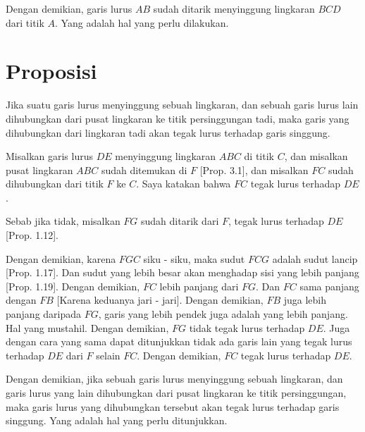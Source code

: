 \documentclass[a4paper]{book}
\begin{document}
Dengan demikian, garis lurus $AB$ sudah ditarik menyinggung lingkaran $BCD$ dari
titik $A$. Yang adalah hal yang perlu dilakukan.

\section*{\centering Proposisi \thesection}
Jika suatu garis lurus menyinggung sebuah lingkaran, dan sebuah garis lurus 
lain dihubungkan dari pusat lingkaran ke titik persinggungan tadi, maka garis
yang dihubungkan dari lingkaran tadi akan tegak lurus terhadap garis singgung.
\begin{center}
\end{center}
Misalkan garis lurus $DE$ menyinggung lingkaran $ABC$ di titik $C$, dan 
misalkan 
pusat lingkaran $ABC$ sudah ditemukan di $F$ [Prop. 3.1], dan misalkan $FC$ 
sudah
dihubungkan dari titik $F$ ke $C$. Saya katakan bahwa $FC$ tegak lurus terhadap
$DE$.

Sebab jika tidak, misalkan $FG$ sudah ditarik dari $F$, tegak lurus terhadap 
$DE$ [Prop. 1.12].

Dengan demikian, karena $FGC$ siku - siku, maka sudut $FCG$ adalah sudut lancip 
[Prop. 1.17]. Dan sudut yang lebih besar akan menghadap sisi yang lebih panjang 
[Prop. 1.19]. Dengan demikian, $FC$ lebih panjang dari $FG$. Dan $FC$ sama 
panjang dengan $FB$ [Karena keduanya jari - jari]. Dengan demikian, $FB$ juga 
lebih panjang daripada $FG$, garis yang lebih pendek juga adalah yang lebih
panjang. Hal yang mustahil. Dengan demikian, $FG$ tidak tegak lurus terhadap 
$DE$.  Juga dengan cara yang sama dapat ditunjukkan tidak ada garis lain yang 
tegak lurus terhadap $DE$ dari $F$ selain $FC$. Dengan demikian, $FC$ tegak 
lurus terhadap $DE$.

Dengan demikian, jika sebuah garis lurus menyinggung sebuah lingkaran, dan garis
lurus yang lain dihubungkan dari pusat lingkaran ke titik persinggungan, maka
garis lurus yang dihubungkan tersebut akan tegak lurus terhadap garis singgung.
Yang adalah hal yang perlu ditunjukkan.
\end{document}
